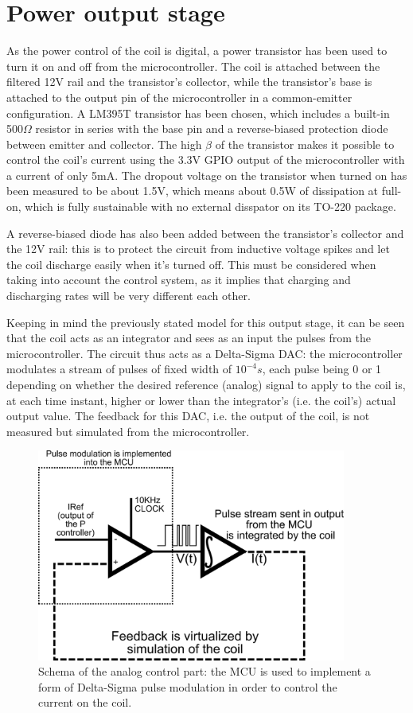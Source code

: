 \section{Power output stage}
As the power control of the coil is digital, a power transistor has been used to turn it on and off from the microcontroller. The coil is attached between the filtered 12V rail and the transistor's collector, while the transistor's base is attached to the output pin of the microcontroller in a common-emitter configuration. A LM395T transistor has been chosen, which includes a built-in 500$\Omega$ resistor in series with the base pin and a reverse-biased protection diode between emitter and collector. The high $\beta$ of the transistor makes it possible to control the coil's current using the 3.3V GPIO output of the microcontroller with a current of only 5mA. The dropout voltage on the transistor when turned on has been measured to be about 1.5V, which means about 0.5W of dissipation at full-on, which is fully sustainable with no external disspator on its TO-220 package.

A reverse-biased diode has also been added between the transistor's collector and the 12V rail: this is to protect the circuit from inductive voltage spikes and let the coil discharge easily when it's turned off. This must be considered when taking into account the control system, as it implies that charging and discharging rates will be very different each other.

Keeping in mind the previously stated model for this output stage, it can be seen that the coil acts as an integrator and sees as an input the pulses from the microcontroller. The circuit thus acts as a Delta-Sigma DAC: the microcontroller modulates a stream of pulses of fixed width of $10^{-4} s$, each pulse being 0 or 1 depending on whether the desired reference (analog) signal to apply to the coil is, at each time instant, higher or lower than the integrator's (i.e. the coil's) actual output value. The feedback for this DAC, i.e. the output of the coil, is not measured but simulated from the microcontroller.


\begin{figure}[htbp]
\centering
\includegraphics[width=4in]{Graphics/DSModulator.png}
\caption{Schema of the analog control part: the MCU is used to implement a form of Delta-Sigma pulse modulation in order to control the current on the coil.}
\end{figure}

